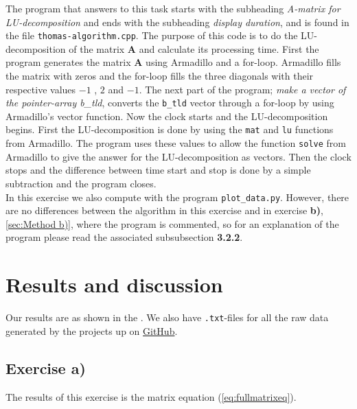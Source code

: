 \documentclass{article}
\begin{document}
    The program that answers to this task starts with the subheading \textit{A-matrix for LU-decomposition} and ends with the subheading \textit{display duration}, and is found in the file \texttt{thomas-algorithm.cpp}. The purpose of this code is to do the LU-decomposition of the matrix \textbf{A} and calculate its processing time. First the program generates the matrix \textbf{A} using Armadillo and a for-loop. Armadillo fills the matrix with zeros and the for-loop fills the three diagonals with their respective values $-1$ , $2$ and $ -1$. The next part of the program; \textit{make a vector of the pointer-array b\_tld}, converts the \texttt{b\_tld} vector through a for-loop by using Armadillo's vector function. Now the clock starts and the LU-decomposition begins. First the LU-decomposition is done by using the \texttt{mat} and \texttt{lu} functions from Armadillo. The program uses these values to allow the function \texttt{solve} from Armadillo to give the answer for the LU-decomposition as vectors. Then the clock stops and the difference between time start and stop is done by a simple subtraction and the program closes. \\

    In this exercise we also compute with the program \texttt{plot\_data.py}. However, there are no differences between the algorithm in this exercise and in exercise \textbf{b)}, \ref{sec:Method b)}, where the program is commented, so for an explanation of the program please read the associated subsubsection \textbf{3.2.2}.



\vspace{1cm}

\section{Results and discussion} \label{sec:Results}

  Our results are as shown in the . We also have \texttt{.txt}-files for all the raw data generated by the projects up on \href{https://github.com/Erikbgram/Fys3150}{GitHub}. \\

  \subsection{Exercise a)} \label{sec:Results a)}

    The results of this exercise is the matrix equation (\ref{eq:fullmatrixeq}).
\end{document}

